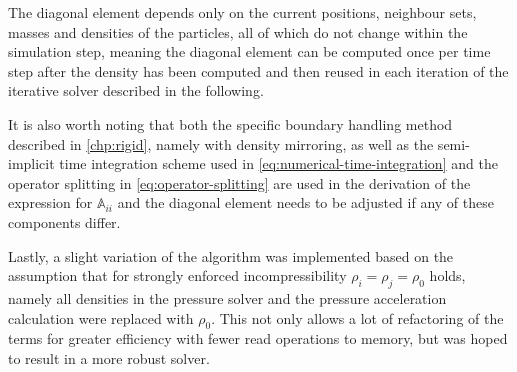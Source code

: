 \documentclass[oneside, a4paper]{book}
\begin{document}
    The diagonal element depends only on the current positions, neighbour sets, masses and densities of the particles, all of which do not change within the simulation step, meaning the diagonal element can be computed once per time step after the density has been computed and then reused in each iteration of the iterative solver described in the following. 
    
    It is also worth noting that both the specific boundary handling method described in \autoref{chp:rigid}, namely \autocite[consistent boundaries]{consistent-boundaries} with density mirroring, as well as the semi-implicit time integration scheme used in \autoref{eq:numerical-time-integration} and the operator splitting in \autoref{eq:operator-splitting} are used in the derivation of the expression for $\mathds{A}_{ii}$ and the diagonal element needs to be adjusted if any of these components differ.

    Lastly, a slight variation of the algorithm was implemented based on the assumption that for strongly enforced incompressibility $\rho_i=\rho_j=\rho_0$ holds, namely all densities in the pressure solver and the pressure acceleration calculation were replaced with $\rho_0$. This not only allows a lot of refactoring of the terms for greater efficiency with fewer read operations to memory, but was hoped to result in a more robust solver. 
\end{document}
